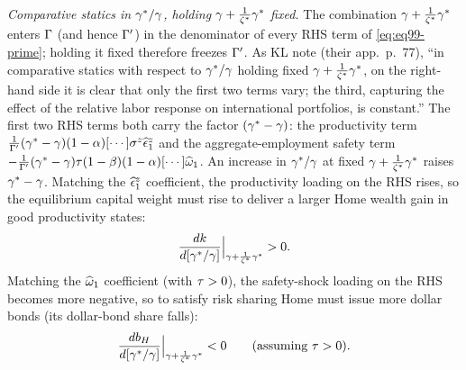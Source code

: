 \emph{Comparative statics in $\gamma^{*}/\gamma$, holding $\gamma+\frac{1}{\zeta^{*}}\gamma^{*}$
fixed.} The combination $\gamma+\frac{1}{\zeta^{*}}\gamma^{*}$ enters $\Gamma$ (and hence
$\Gamma'$) in the denominator of every RHS term of \eqref{eq:eq99-prime}; holding it
fixed therefore freezes $\Gamma'$. As KL note (their app.~p.~77), ``in comparative
statics with respect to $\gamma^{*}/\gamma$ holding fixed $\gamma+\frac{1}{\zeta^{*}}\gamma^{*}$, on
the right-hand side it is clear that only the first two terms vary; the third,
capturing the effect of the relative labor response on international portfolios,
is constant.'' The first two RHS terms both carry the factor $(\gamma^{*}-\gamma)$: the
productivity term $\frac{1}{\Gamma'}(\gamma^{*}-\gamma)(1-\alpha)[\cdots]\sigma^z\widehat{\epsilon}^z_1$
and the aggregate-employment safety term
$-\frac{1}{\Gamma'}(\gamma^{*}-\gamma)\tau(1-\beta)(1-\alpha)[\cdots]\widehat{\omega}_1$. An
increase in $\gamma^{*}/\gamma$ at fixed $\gamma+\frac{1}{\zeta^{*}}\gamma^{*}$ raises $\gamma^{*}-\gamma$.
Matching the $\widehat{\epsilon}^z_1$ coefficient, the productivity loading on the RHS
rises, so the equilibrium capital weight must rise to deliver a larger Home
wealth gain in good productivity states:
\begin{equation}
\frac{dk}{d[\gamma^{*}/\gamma]}\Big|_{\gamma+\frac{1}{\zeta^{*}}\gamma^{*}} > 0. \label{eq:cs-k-gamma}
\end{equation}
Matching the $\widehat{\omega}_1$ coefficient (with $\tau>0$), the safety-shock
loading on the RHS becomes more negative, so to satisfy risk sharing Home must
issue more dollar bonds (its dollar-bond share falls):
\begin{equation}
\frac{db_H}{d[\gamma^{*}/\gamma]}\Big|_{\gamma+\frac{1}{\zeta^{*}}\gamma^{*}} < 0
\qquad(\text{assuming } \tau>0). \label{eq:cs-bH-gamma}
\end{equation}

